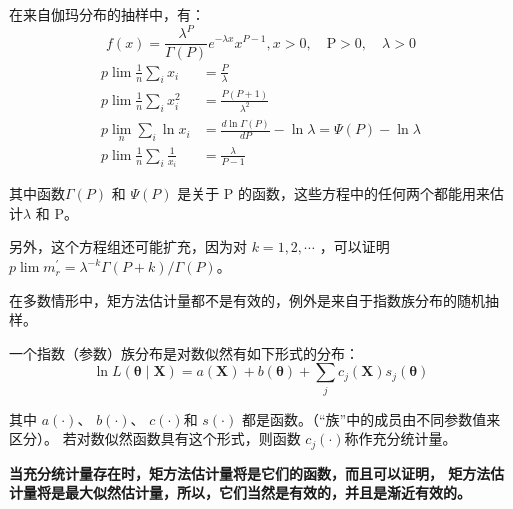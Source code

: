 \begin{myexample}[实例 2]
    在来自伽玛分布的抽样中，有：
    $$ f(x)=\frac{\lambda^{P}}{\Gamma(P)} e^{-\lambda x} x^{P-1}, x>0, \quad \mathrm{P}>0, \quad \lambda>0 $$
    $$ \begin{aligned}
        p \lim \frac{1}{n} \sum_{i} x_{i} & = \frac{P}{\lambda} \\
        p \lim \frac{1}{n} \sum_{i} x_{i}^{2} & = \frac{P(P+1)}{\lambda^{2}} \\
        p \lim _{n} \sum_{i} \ln x_{i} & = \frac{d \ln \Gamma(P)}{d P}-\ln \lambda  = \Psi(P)-\ln \lambda \\
        p \lim \frac{1}{n} \sum_{i} \frac{1}{x_{i}} & = \frac{\lambda}{P-1}
        \end{aligned} $$

        其中函数$ \Gamma(P)$ 和 $ \Psi(P) $ 是关于 P 的函数，这些方程中的任何两个都能用来估计$ \lambda $ 和 P。

        另外，这个方程组还可能扩充，因为对 $   k=1,  2,  \cdots $ ，可以证明$ p \lim m_{r}^{\prime}=\lambda^{-k} \Gamma(P+k) / \Gamma(P) $。

        在多数情形中，矩方法估计量都不是有效的，例外是来自于指数族分布的随机抽样。
        \begin{mydef}
            一个指数（参数）族分布是对数似然有如下形式的分布：
            $$ \ln L(\boldsymbol{\theta \mid X})=a(\boldsymbol{X})+b(\boldsymbol{\theta})+\sum_{j} c_{j}(\boldsymbol{X}) s_{j}(\boldsymbol{\theta}) $$

            其中 $ a(\cdot) $、 $ b(\cdot) $、  $ c(\cdot) $和 $ s(\cdot) $  都是函数。（“族”中的成员由不同参数值来区分）。
            若对数似然函数具有这个形式，则函数 $ c_j(\cdot) $称作充分统计量。

         { \bf 当充分统计量存在时，矩方法估计量将是它们的函数，而且可以证明， 矩方法估计量将是最大似然估计量，所以，它们当然是有效的，并且是渐近有效的。}
        \end{mydef}      
\end{myexample}

